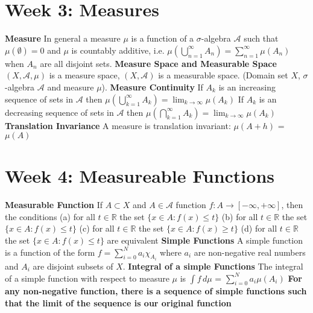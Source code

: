 \documentclass{article}
\begin{document}
\section{Week 3: Measures}
\textbf{Measure} In general a measure $\mu$ is a function of a $\sigma$-algebra $\mathcal{A}$ such that $\mu(\emptyset) = 0$ and $\mu$ is countably additive, i.e. $\mu(\bigcup\limits_{n=1}^{\infty}A_n) = \sum_{n=1}^{\infty} \mu(A_n)$ when $A_n$ are all disjoint sets.
\newline \newline \textbf{Measure Space and Measurable Space} $(X, \mathcal{A}, \mu)$ is a measure space, $(X, \mathcal{A})$ is a measurable space. (Domain set $X$, $\sigma$-algebra $\mathcal{A}$ and measure $\mu$).
\newline \newline \textbf{Measure Continuity} If $A_k$ is an increasing sequence of sets in $\mathcal{A}$ then $\mu(\bigcup\limits_{k=1}^{\infty}A_k) = \lim_{k\to\infty} \mu(A_k)$
\newline If $A_k$ is an decreasing sequence of sets in $\mathcal{A}$ then $\mu(\bigcap\limits_{k=1}^{\infty}A_k) = \lim_{k\to\infty} \mu(A_k)$
\newline \newline \textbf{Translation Invariance} A measure is translation invariant: $\mu(A + h)$ = $\mu(A)$
\section{Week 4: Measureable Functions}
\textbf{Measurable Function} If $A \subset X$ and $A \in \mathcal{A}$ function $f: A \rightarrow [-\infty, +\infty]$, then the conditions
\newline (a) for all $t \in \mathbb{R}$ the set $\{ x \in A : f(x) \leq t \}$
\newline (b) for all $t \in \mathbb{R}$ the set $\{ x \in A : f(x) \leq t \}$
\newline (c) for all $t \in \mathbb{R}$ the set $\{ x \in A : f(x) \geq t \}$
\newline (d) for all $t \in \mathbb{R}$ the set $\{ x \in A : f(x) \leq t \}$
\newline are equivalent
\newline \newline \textbf{Simple Functions} A simple function is a function of the form $f = \sum\limits_{i=0}^N a_i\chi_{A_i}$ where $a_i$ are non-negative real numbers and $A_i$ are disjoint subsets of $X$.
\newline \newline \textbf{Integral of a simple Functions} The integral of a simple function with respect to measure $\mu$ is $\int f \,d\mu$ = $\sum\limits_{i=0}^N a_i\mu(A_i)$
\newline \newline \textbf{For any non-negative function, there is a sequence of simple functions such that the limit of the sequence is our original function}
\end{document}
